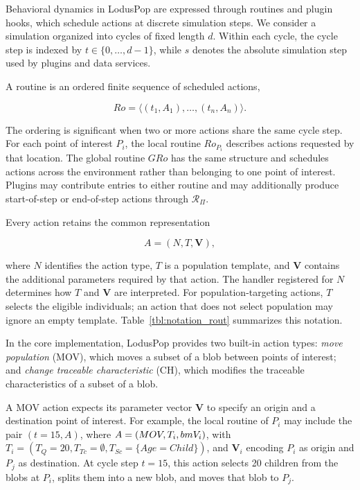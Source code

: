 \begingroup\color{red}
Behavioral dynamics in LodusPop are expressed through routines and plugin hooks, which schedule actions at discrete simulation steps. We consider a simulation organized into cycles of fixed length $d$. Within each cycle, the cycle step is indexed by $t\in\{0,\ldots,d-1\}$, while $s$ denotes the absolute simulation step used by plugins and data services.

A routine is an ordered finite sequence of scheduled actions,

\begin{equation}
Ro=\langle(t_1,A_1),\ldots,(t_n,A_n)\rangle.
\label{eq:routine_definition}
\end{equation}

The ordering is significant when two or more actions share the same cycle step. For each point of interest $P_i$, the local routine $Ro_{P_i}$ describes actions requested by that location. The global routine $GRo$ has the same structure and schedules actions across the environment rather than belonging to one point of interest. Plugins may contribute entries to either routine and may additionally produce start-of-step or end-of-step actions through $\mathcal{R}_{\Pi}$.

Every action retains the common representation

\begin{equation}
A=(N,T,\bm{V}),
\label{eq:action_definition}
\end{equation}

where $N$ identifies the action type, $T$ is a population template, and $\bm{V}$ contains the additional parameters required by that action. The handler registered for $N$ determines how $T$ and $\bm{V}$ are interpreted. For population-targeting actions, $T$ selects the eligible individuals; an action that does not select population may ignore an empty template. Table~\ref{tbl:notation_rout} summarizes this notation.
\endgroup

In the core implementation, LodusPop provides two built-in action types:
\textit{move population} (MOV), which moves a subset of a blob between points of interest; and \textit{change traceable characteristic} (CH), which modifies the traceable characteristics of a subset of a blob.

A MOV action expects its parameter vector $\bm{V}$ to specify an origin and a destination point of interest. For example, the local routine of $P_i$ may include the pair $(t = 15, A)$, where $A = (MOV, T_i, \\bm{V}_i)$, with $T_i=(T_Q=20, T_{Tc}=\emptyset, T_{Sc}=\{Age=Child\})$, and $\bm{V}_i$ encoding $P_i$ as origin and $P_j$ as destination. At cycle step $t = 15$, this action selects 20 children from the blobs at $P_i$, splits them into a new blob, and moves that blob to $P_j$.

